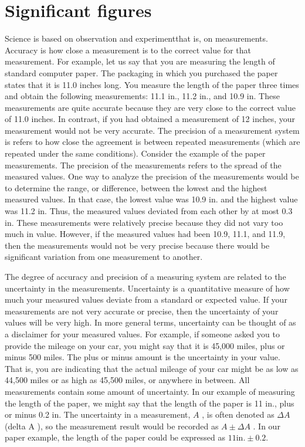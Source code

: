 \section{Significant figures}\label{sec:sig-figs}
Science is based on observation and experimentthat is, on measurements. Accuracy is how close a measurement is to the correct value for that measurement. For example, let us say that you are measuring the length of standard computer paper. The packaging in which you purchased the paper states that it is 11.0 inches long. You measure the length of the paper three times and obtain the following measurements: 11.1 in., 11.2 in., and 10.9 in. These measurements are quite accurate because they are very close to the correct value of 11.0 inches. In contrast, if you had obtained a measurement of 12 inches, your measurement would not be very accurate.
The precision of a measurement system is refers to how close the agreement is between repeated measurements (which are repeated under the
same conditions). Consider the example of the paper measurements. The precision of the measurements refers to the spread of the measured
values. One way to analyze the precision of the measurements would be to determine the range, or difference, between the lowest and the highest measured values. In that case, the lowest value was 10.9 in. and the highest value was 11.2 in. Thus, the measured values deviated from each other by at most 0.3 in. These measurements were relatively precise because they did not vary too much in value. However, if the measured values had been 10.9, 11.1, and 11.9, then the measurements would not be very precise because there would be significant variation from one measurement to another.

The degree of accuracy and precision of a measuring system are related to the uncertainty in the measurements. Uncertainty is a quantitative measure of how much your measured values deviate from a standard or expected value. If your measurements are not very accurate or precise, then the uncertainty of your values will be very high. In more general terms, uncertainty can be thought of as a disclaimer for your measured values. For example, if someone asked you to provide the mileage on your car, you might say that it is 45,000 miles, plus or minus 500 miles. The plus or minus amount is the uncertainty in your value. That is, you are indicating that the actual mileage of your car might be as low as 44,500 miles or as high as 45,500 miles, or anywhere in between. All measurements contain some amount of uncertainty. In our example of measuring the length of the paper, we might say that the length of the paper is 11 in., plus or minus 0.2 in. The uncertainty in a measurement, $A$ , is often denoted as $\Delta A$ (delta A ),
so the measurement result would be recorded as $A \pm \Delta A$ . In our paper example, the length of the paper could be expressed as $11 \text{in}. \pm 0.2$.

